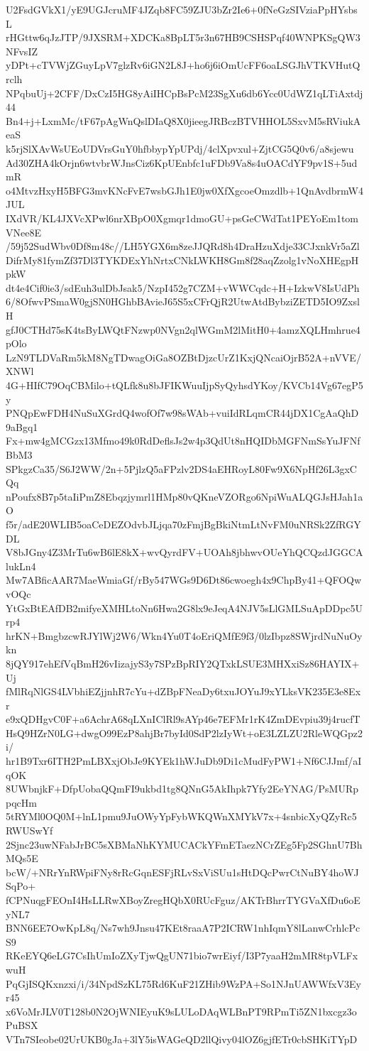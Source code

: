 U2FsdGVkX1/yE9UGJcruMF4JZqb8FC59ZJU3bZr2Ie6+0fNeGzSIVziaPpHYsbsL
rHGttw6qJzJTP/9JXSRM+XDCKa8BpLT5r3n67HB9CSHSPqf40WNPKSgQW3NFvsIZ
yDPt+cTVWjZGuyLpV7glzRv6iGN2L8J+ho6j6iOmUcFF6oaLSGJhVTKVHutQrclh
NPqbuUj+2CFF/DxCzI5HG8yAiIHCpBsPcM23SgXu6db6Ycc0UdWZ1qLTiAxtdj44
Bn4+j+LxmMc/tF67pAgWnQslDIaQ8X0jieegJRBczBTVHHOL5SxvM5sRViukAeaS
k5rjSlXAvWsUEoUDVrsGuY0hfbbypYpUPdj/4clXpvxul+ZjtCG5Q0v6/a8sjewu
Ad30ZHA4kOrjn6wtvbrWJnsCiz6KpUEnbfc1uFDb9Va8s4uOACdYF9pv1S+5udmR
o4MtvzHxyH5BFG3mvKNcFvE7wsbGJh1E0jw0XfXgcoeOmzdlb+1QnAvdbrmW4JUL
IXdVR/KL4JXVcXPwl6nrXBpO0Xgmqr1dmoGU+psGeCWdTat1PEYoEm1tomVNee8E
/59j52SudWbv0Df8m48c//LH5YGX6m8zeJJQRd8h4DraHzuXdje33CJxnkVr5aZl
DifrMy81fymZf37Dl3TYKDExYhNrtxCNkLWKH8Gm8f28aqZzolg1vNoXHEgpHpkW
dt4e4Cif0ie3/sdEuh3ulDbJsak5/NzpI452g7CZM+vWWCqdc+H+IzkwV8IsUdPh
6/8OfwvPSmaW0gjSN0HGhbBAvieJ65S5xCFrQjR2UtwAtdBybziZETD5IO9ZxslH
gfJ0CTHd75sK4tsByLWQtFNzwp0NVgn2qlWGmM2lMitH0+4amzXQLHmhrue4pOlo
LzN9TLDVaRm5kM8NgTDwagOiGa8OZBtDjzcUrZ1KxjQNcaiOjrB52A+nVVE/XNWl
4G+HIfC79OqCBMilo+tQLfk8u8bJFIKWuuIjpSyQyhsdYKoy/KVCb14Vg67egP5y
PNQpEwFDH4NuSuXGrdQ4wofOf7w98sWAb+vuiIdRLqmCR44jDX1CgAaQhD9aBgq1
Fx+mw4gMCGzx13Mfmo49k0RdDeflsJs2w4p3QdUt8nHQIDbMGFNmSsYuJFNfBbM3
SPkgzCa35/S6J2WW/2n+5PjlzQ5aFPzlv2DS4aEHRoyL80Fw9X6NpHf26L3gxCQq
nPoufx8B7p5taIiPmZ8Ebqzjymrl1HMp80vQKneVZORgo6NpiWuALQGJsHJah1aO
f5r/adE20WLIB5oaCeDEZOdvbJLjqa70zFmjBgBkiNtmLtNvFM0uNRSk2ZfRGYDL
V8bJGny4Z3MrTu6wB6lE8kX+wvQyrdFV+UOAh8jbhwvOUeYhQCQzdJGGCAlukLn4
Mw7ABficAAR7MaeWmiaGf/rBy547WGs9D6Dt86cwoegh4x9ChpBy41+QFOQwvOQc
YtGxBtEAfDB2mifyeXMHLtoNn6Hwa2G8lx9eJeqA4NJV5sLlGMLSuApDDpc5Urp4
hrKN+BmgbzcwRJYlWj2W6/Wkn4Yu0T4oEriQMfE9f3/0lzIbpz8SWjrdNuNuOykn
8jQY917ehEfVqBmH26vIizajyS3y7SPzBpRIY2QTxkLSUE3MHXxiSz86HAYIX+Uj
fMlRqNlGS4LVbhiEZjjnhR7cYu+dZBpFNeaDy6txuJOYuJ9xYLksVK235E3e8Exr
e9xQDHgvC0F+a6AchrA68qLXnIClRl9sAYp46e7EFMr1rK4ZmDEvpiu39j4rucfT
HsQ9HZrN0LG+dwgO99EzP8ahjBr7byId0SdP2lzIyWt+oE3LZLZU2RleWQGpz2i/
hr1B9Txr6ITH2PmLBXxjObJe9KYEk1hWJuDb9Di1cMudFyPW1+Nf6CJJmf/aIqOK
8UWbnjkF+DfpUobaQQmFI9ukbd1tg8QNnG5AkIhpk7Yfy2EeYNAG/PsMURppqcHm
5tRYMl0OQ0M+lnL1pmu9JuOWyYpFybWKQWnXMYkV7x+4snbicXyQZyRc5RWUSwYf
2Sjnc23uwNFabJrBC5sXBMaNhKYMUCACkYFmETaezNCrZEg5Fp2SGhnU7BhMQs5E
bcW/+NRrYnRWpiFNy8rRcGqnESFjRLvSxViSUu1sHtDQcPwrCtNuBY4hoWJSqPo+
fCPNuqgFEOnI4HsLLRwXBoyZregHQbX0RUcFguz/AKTrBhrrTYGVaXfDu6oEyNL7
BNN6EE7OwKpL8q/Ns7wh9Jnsu47KEt8raaA7P2ICRW1nhIqmY8lLanwCrhlcPcS9
RKeEYQ6eLG7CsIhUmIoZXyTjwQgUN71bio7wrEiyf/I3P7yaaH2mMR8tpVLFxwuH
PqGjISQKxnzxi/i/34NpdSzKL75Rd6KuF21ZHib9WzPA+So1NJnUAWWfxV3Eyr45
x6VoMrJLV0T128b0N2OjWNIEyuK9sLULoDAqWLBnPT9RPmTi5ZN1bxcgz3oPuBSX
VTn7SIeobe02UrUKB0gJa+3lY5isWAGeQD2llQivy04lOZ6gjfETr0cbSHKiTYpD
